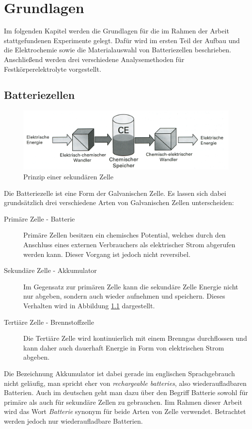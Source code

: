 \documentclass[a4paper, 11pt, headsepline,footsepline,twoside,abstract]{scrbook}
\begin{document}
\chapter{Grundlagen}
Im folgenden Kapitel werden die Grundlagen für die im Rahmen der Arbeit stattgefundenen Experimente gelegt. Dafür wird im ersten Teil der Aufbau und die Elektrochemie sowie die Materialauswahl von Batteriezellen beschrieben. Anschließend werden drei verschiedene Analysemethoden für Festkörperelektrolyte vorgestellt.
\section{Batteriezellen}
\begin{figure}
	\centering
	\includegraphics[width=1.0\columnwidth]{images/Prinzipieller_Aufbau.png}
	\caption{Prinzip einer sekundären Zelle}
	\label{Prinzip_Zelle}
\end{figure}
Die Batteriezelle ist eine Form der Galvanischen Zelle. Es lassen sich dabei grundsätzlich drei verschiedene Arten von Galvanischen Zellen unterscheiden:
\begin{description}
\item[Primäre Zelle - Batterie] Primäre Zellen besitzen ein chemisches Potential, welches durch den Anschluss eines externen Verbrauchers als elektrischer Strom abgerufen werden kann. Dieser Vorgang ist jedoch nicht reversibel.
\item[Sekundäre Zelle - Akkumulator] Im Gegensatz zur primären Zelle kann die sekundäre Zelle Energie nicht nur abgeben, sondern auch wieder aufnehmen und speichern. Dieses Verhalten wird in Abbildung \ref{Prinzip_Zelle} dargestellt.
\item[Tertiäre Zelle - Brennstoffzelle] Die Tertiäre Zelle wird kontinuierlich mit einem Brenngas durchflossen und kann daher auch dauerhaft Energie in Form von elektrischen Strom abgeben.  
\end{description}
Die Bezeichnung Akkumulator ist dabei gerade im englischen Sprachgebrauch nicht geläufig, man spricht eher von \textit{rechargeable batteries}, also wiederaufladbaren Batterien. Auch im deutschen geht man dazu über den Begriff Batterie sowohl für primäre als auch für sekundäre Zellen zu gebrauchen. Iim Rahmen dieser Arbeit wird das Wort \textit{Batterie} synonym für beide Arten von Zelle verwendet. Betrachtet werden jedoch nur wiederaufladbare Batterien.
\end{document}
